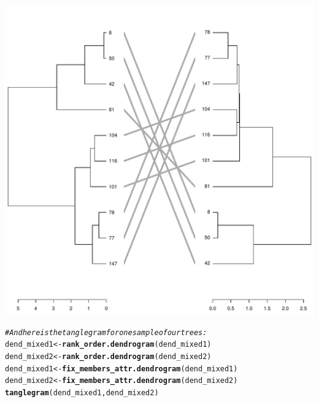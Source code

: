 \documentclass[shortnames,nojss,article]{jss}\usepackage[]{graphicx}\usepackage[]{color}
\makeatletter
\def\maxwidth{ %
  \ifdim\Gin@nat@width>\linewidth
    \linewidth
  \else
    \Gin@nat@width
  \fi
}
\newcommand{\hlcom}[1]{\textcolor[rgb]{0.678,0.584,0.686}{\textit{#1}}}%
\newcommand{\hlstd}[1]{\textcolor[rgb]{0.345,0.345,0.345}{#1}}%
\newcommand{\hlkwb}[1]{\textcolor[rgb]{0.69,0.353,0.396}{#1}}%
\newcommand{\hlkwd}[1]{\textcolor[rgb]{0.737,0.353,0.396}{\textbf{#1}}}%
\newenvironment{kframe}{%
 \def\at@end@of@kframe{}%
 \ifinner\ifhmode%
  \def\at@end@of@kframe{\end{minipage}}%
  \begin{minipage}{\columnwidth}%
 \fi\fi%
 \def\FrameCommand##1{\hskip\@totalleftmargin \hskip-\fboxsep
 \colorbox{shadecolor}{##1}\hskip-\fboxsep
     \hskip-\linewidth \hskip-\@totalleftmargin \hskip\columnwidth}%
 \MakeFramed {\advance\hsize-\width
   \@totalleftmargin\z@ \linewidth\hsize
   \@setminipage}}%
 {\par\unskip\endMakeFramed%
 \at@end@of@kframe}
\newenvironment{knitrout}{}{} %
\makeatother
\begin{document}
\begin{knitrout}
{\centering \includegraphics[width=\maxwidth]{figure/cor_bakers_gamma_simulation_CI_41} 

}


\begin{kframe}\begin{alltt}
\hlcom{# And here is the tanglegram for one sample of our trees:}
\hlstd{dend_mixed1} \hlkwb{<-} \hlkwd{rank_order.dendrogram}\hlstd{(dend_mixed1)}
\hlstd{dend_mixed2} \hlkwb{<-} \hlkwd{rank_order.dendrogram}\hlstd{(dend_mixed2)}
\hlstd{dend_mixed1} \hlkwb{<-} \hlkwd{fix_members_attr.dendrogram}\hlstd{(dend_mixed1)}
\hlstd{dend_mixed2} \hlkwb{<-} \hlkwd{fix_members_attr.dendrogram}\hlstd{(dend_mixed2)}
\hlkwd{tanglegram}\hlstd{(dend_mixed1, dend_mixed2)}
\end{alltt}
\end{kframe}


\end{knitrout}
\end{document}
